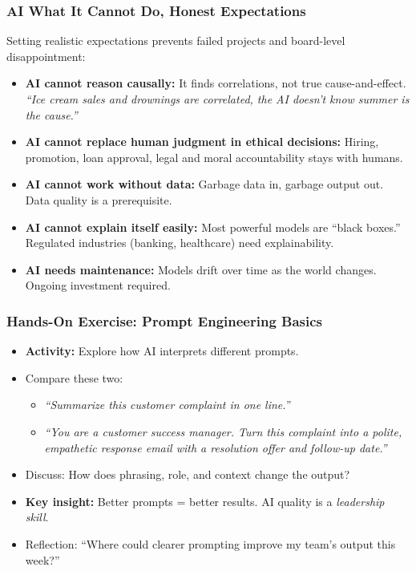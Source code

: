 \begin{frame}[fragile]\frametitle{AI What It Cannot Do, Honest Expectations}

Setting realistic expectations prevents failed projects and board-level disappointment:
\begin{itemize}
  \item \textbf{AI cannot reason causally:} It finds correlations, not true cause-and-effect.\\
    \textit{``Ice cream sales and drownings are correlated, the AI doesn't know summer is the cause.''}
  \item \textbf{AI cannot replace human judgment in ethical decisions:} Hiring, promotion, loan approval, legal and moral accountability stays with humans.
  \item \textbf{AI cannot work without data:} Garbage data in, garbage output out. Data quality is a prerequisite.
  \item \textbf{AI cannot explain itself easily:} Most powerful models are ``black boxes.'' Regulated industries (banking, healthcare) need explainability.
  \item \textbf{AI needs maintenance:} Models drift over time as the world changes. Ongoing investment required.
\end{itemize}

\end{frame}

\begin{frame}[fragile]\frametitle{Hands-On Exercise: Prompt Engineering Basics}

    \begin{itemize}
      \item \textbf{Activity:} Explore how AI interprets different prompts.
      \item Compare these two:
        \begin{itemize}
          \item \textit{``Summarize this customer complaint in one line.''}
          \item \textit{``You are a customer success manager. Turn this complaint into a polite, empathetic response email with a resolution offer and follow-up date.''}
        \end{itemize}
      \item Discuss: How does phrasing, role, and context change the output?
      \item \textbf{Key insight:} Better prompts = better results. AI quality is a \textit{leadership skill}.
      \item Reflection: ``Where could clearer prompting improve my team's output this week?''
    \end{itemize}

\end{frame}


